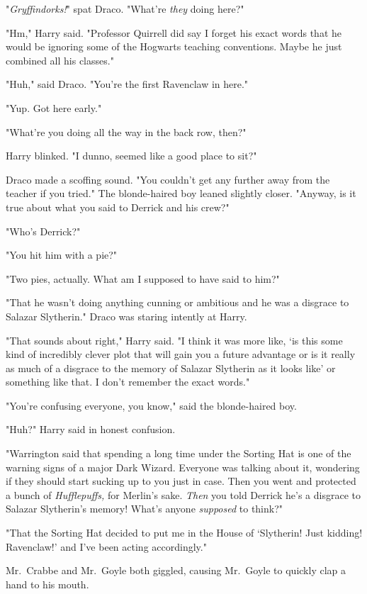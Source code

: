 "\emph{Gryffindorks!}" spat Draco. "What're \emph{they} doing here?"

"Hm," Harry said. "Professor Quirrell did say{\el} I forget his exact
words{\el} that he would be ignoring some of the Hogwarts teaching
conventions. Maybe he just combined all his classes."

"Huh," said Draco. "You're the first Ravenclaw in here."

"Yup. Got here early."

"What're you doing all the way in the back row, then?"

Harry blinked. "I dunno, seemed like a good place to sit?"

Draco made a scoffing sound. "You couldn't get any further away from the
teacher if you tried." The blonde-haired boy leaned slightly closer. "Anyway,
is it true about what you said to Derrick and his crew?"

"Who's Derrick?"

"You hit him with a pie?"

"Two pies, actually. What am I supposed to have said to him?"

"That he wasn't doing anything cunning or ambitious and he was a disgrace to
Salazar Slytherin." Draco was staring intently at Harry.

"That{\el} sounds about right," Harry said. "I think it was more like, `is
this some kind of incredibly clever plot that will gain you a future advantage
or is it really as much of a disgrace to the memory of Salazar Slytherin as it
looks like' or something like that. I don't remember the exact words."

"You're confusing everyone, you know," said the blonde-haired boy.

"Huh?" Harry said in honest confusion.

"Warrington said that spending a long time under the Sorting Hat is one of the
warning signs of a major Dark Wizard. Everyone was talking about it, wondering
if they should start sucking up to you just in case. Then you went and
protected a bunch of \emph{Hufflepuffs,} for Merlin's sake. \emph{Then} you
told Derrick he's a disgrace to Salazar Slytherin's memory! What's anyone
\emph{supposed} to think?"

"That the Sorting Hat decided to put me in the House of `Slytherin! Just
kidding! Ravenclaw!' and I've been acting accordingly."

Mr.~Crabbe and Mr.~Goyle both giggled, causing Mr.~Goyle to quickly clap a hand
to his mouth.

